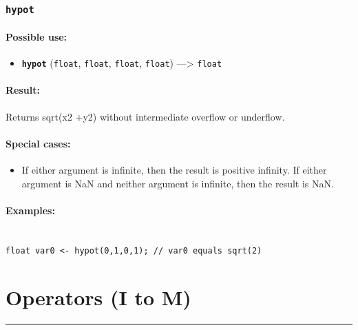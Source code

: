 \documentclass[]{book}
\providecommand{\tightlist}{%
  \setlength{\itemsep}{0pt}\setlength{\parskip}{0pt}}
\theoremstyle{definition}
\theoremstyle{definition}
\theoremstyle{definition}
\theoremstyle{remark}
\begin{document}
\subsection{\texorpdfstring{\texttt{hypot}}{hypot}}\label{hypot}

\subsubsection{Possible use:}\label{possible-use-262}

\begin{itemize}
\tightlist
\item
  \textbf{\texttt{hypot}} (\texttt{float}, \texttt{float},
  \texttt{float}, \texttt{float}) ---\textgreater{} \texttt{float}
\end{itemize}

\subsubsection{Result:}\label{result-252}

Returns sqrt(x2 +y2) without intermediate overflow or underflow.

\subsubsection{Special cases:}\label{special-cases-76}

\begin{itemize}
\tightlist
\item
  If either argument is infinite, then the result is positive infinity.
  If either argument is NaN and neither argument is infinite, then the
  result is NaN.
\end{itemize}

\subsubsection{Examples:}\label{examples-201}

\begin{verbatim}
 
float var0 <- hypot(0,1,0,1); // var0 equals sqrt(2)
\end{verbatim}

\chapter{Operators (I to M)}\label{operators-i-to-m}

\begin{center}\rule{0.5\linewidth}{\linethickness}\end{center}
\end{document}
